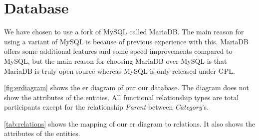 \section{Database}\label{sec:design_database}

We have chosen to use a fork of MySQL called MariaDB. The main reason for using a variant of MySQL is because of previous experience with this. MariaDB offers some additional features and some speed improvements compared to MySQL, but the main reason for choosing MariaDB over MySQL is that MariaDB is truly open source whereas MySQL is only released under GPL.\cite{mariavsmysql}

\autoref{fig:erdiagram} shows the \ac{er} diagram of our our database. The diagram does not show the attributes of the entities. All functional relationship types are total participants except for the relationship \textit{Parent} between \textit{Category}'s.

\autoref{tab:relations} shows the mapping of our \ac{er} diagram to relations. It also shows the attributes of the entities.


\newcommand{\relation}[1]{[\{ #1 \}]\\}
\newcommand{\us}{\textunderscore}

